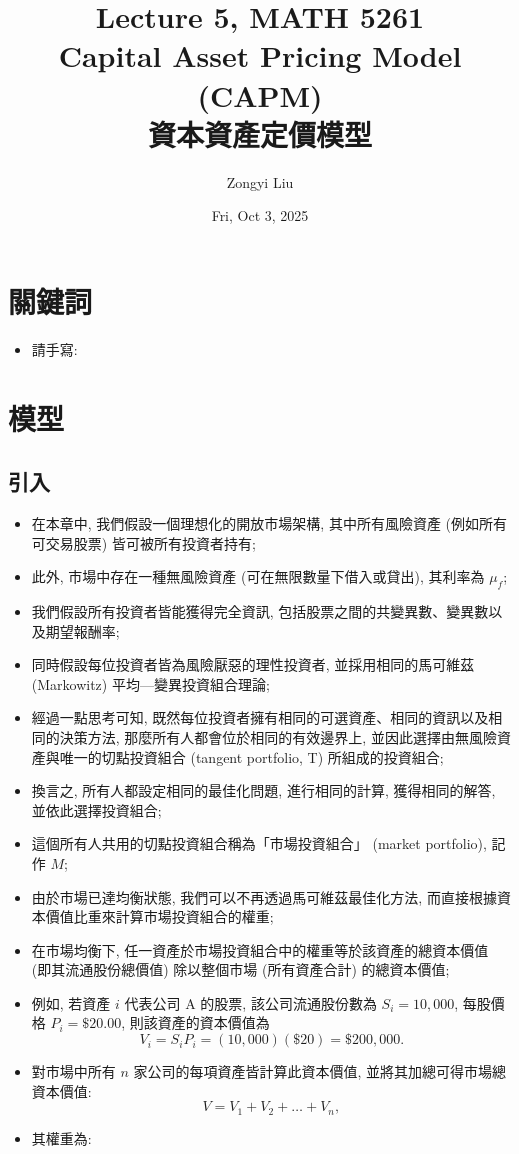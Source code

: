 \documentclass[letterpaper]{article}
\title{Lecture 5, MATH 5261 \\
		\small{Capital Asset Pricing Model  (CAPM) \\
			資本資產定價模型
		}
	}
\author{Zongyi Liu}
\date{Fri, Oct 3, 2025}
\begin{document}
		\maketitle
		
		\tableofcontents
		
		\section{關鍵詞}
		\begin{itemize}
			\item 請手寫: 
		\end{itemize}
		
		
		
		\section{模型}
		\subsection{引入}
		\begin{itemize}
			\item 在本章中, 我們假設一個理想化的開放市場架構, 其中所有風險資產 (例如所有可交易股票) 皆可被所有投資者持有; 
			\item 此外, 市場中存在一種無風險資產 (可在無限數量下借入或貸出), 其利率為 $\mu_{f}$; 
			\item 我們假設所有投資者皆能獲得完全資訊, 包括股票之間的共變異數、變異數以及期望報酬率; 
			\item 同時假設每位投資者皆為風險厭惡的理性投資者, 並採用相同的馬可維茲 (Markowitz) 平均—變異投資組合理論; 
			\item 經過一點思考可知, 既然每位投資者擁有相同的可選資產、相同的資訊以及相同的決策方法, 那麼所有人都會位於相同的有效邊界上, 並因此選擇由無風險資產與唯一的切點投資組合 (tangent portfolio, T) 所組成的投資組合; 
			\item 換言之, 所有人都設定相同的最佳化問題, 進行相同的計算, 獲得相同的解答, 並依此選擇投資組合; 
			\item 這個所有人共用的切點投資組合稱為「市場投資組合」 (market portfolio), 記作 $M$; 
			\item 由於市場已達均衡狀態, 我們可以不再透過馬可維茲最佳化方法, 而直接根據資本價值比重來計算市場投資組合的權重; 
			\item 在市場均衡下, 任一資產於市場投資組合中的權重等於該資產的總資本價值 (即其流通股份總價值) 除以整個市場 (所有資產合計) 的總資本價值; 
			\item 例如, 若資產 $i$ 代表公司 A 的股票, 該公司流通股份數為 $S_{i}=10{, }000$, 每股價格 $P_{i}=\$20.00$, 則該資產的資本價值為
			$$V_{i} = S_{i} P_{i} =  (10{, }000)  (\$20) = \$200{, }000. $$
			\item 對市場中所有 $n$ 家公司的每項資產皆計算此資本價值, 並將其加總可得市場總資本價值: 
			$$V = V_{1} + V_{2} + \ldots + V_{n}, $$
			\item 其權重為: 
		\end{itemize}
		
\end{document}
